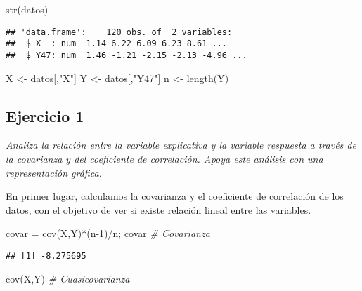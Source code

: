 \documentclass[
]{article}
\newenvironment{Shaded}{\begin{snugshade}}{\end{snugshade}}
\newcommand{\CommentTok}[1]{\textcolor[rgb]{0.56,0.35,0.01}{\textit{#1}}}
\newcommand{\DecValTok}[1]{\textcolor[rgb]{0.00,0.00,0.81}{#1}}
\newcommand{\FunctionTok}[1]{\textcolor[rgb]{0.00,0.00,0.00}{#1}}
\newcommand{\NormalTok}[1]{#1}
\newcommand{\OtherTok}[1]{\textcolor[rgb]{0.56,0.35,0.01}{#1}}
\newcommand{\SpecialCharTok}[1]{\textcolor[rgb]{0.00,0.00,0.00}{#1}}
\newcommand{\StringTok}[1]{\textcolor[rgb]{0.31,0.60,0.02}{#1}}
\begin{document}
\begin{Shaded}
\begin{Highlighting}[]
\FunctionTok{str}\NormalTok{(datos)}
\end{Highlighting}
\end{Shaded}

\begin{verbatim}
## 'data.frame':    120 obs. of  2 variables:
##  $ X  : num  1.14 6.22 6.09 6.23 8.61 ...
##  $ Y47: num  1.46 -1.21 -2.15 -2.13 -4.96 ...
\end{verbatim}

\begin{Shaded}
\begin{Highlighting}[]
\NormalTok{X }\OtherTok{\textless{}{-}}\NormalTok{ datos[,}\StringTok{"X"}\NormalTok{]}
\NormalTok{Y }\OtherTok{\textless{}{-}}\NormalTok{ datos[,}\StringTok{"Y47"}\NormalTok{]}
\NormalTok{n }\OtherTok{\textless{}{-}} \FunctionTok{length}\NormalTok{(Y)}
\end{Highlighting}
\end{Shaded}

\hypertarget{ejercicio-1}{%
\subsection{Ejercicio 1}\label{ejercicio-1}}

\textit{Analiza la relación entre la variable explicativa y la variable respuesta a través de
la covarianza y del coeficiente de correlación. Apoya este análisis con una
representación gráfica.}

En primer lugar, calculamos la covarianza y el coeficiente de
correlación de los datos, con el objetivo de ver si existe relación
lineal entre las variables.

\begin{Shaded}
\begin{Highlighting}[]
\NormalTok{covar }\OtherTok{=} \FunctionTok{cov}\NormalTok{(X,Y)}\SpecialCharTok{*}\NormalTok{(n}\DecValTok{{-}1}\NormalTok{)}\SpecialCharTok{/}\NormalTok{n; covar           }\CommentTok{\# Covarianza}
\end{Highlighting}
\end{Shaded}

\begin{verbatim}
## [1] -8.275695
\end{verbatim}

\begin{Shaded}
\begin{Highlighting}[]
\FunctionTok{cov}\NormalTok{(X,Y)                                  }\CommentTok{\# Cuasicovarianza}
\end{Highlighting}
\end{Shaded}
\end{document}
